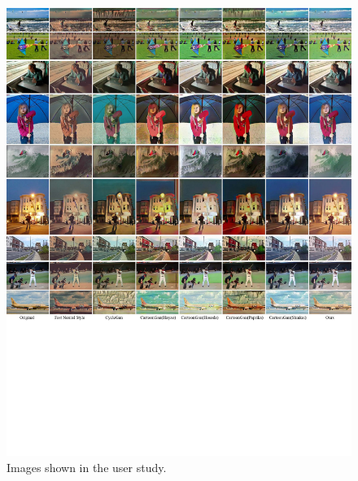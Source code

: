 \documentclass[10pt,twocolumn,letterpaper]{article}
\begin{document}
\begin{figure}[htb]
\vspace{-0.5em}
\centering
\includegraphics[width=\linewidth]{figures/userstudy3.pdf}
\caption{Images shown in the user study.}
\label{fig:userstudy3}
\end{figure}
\end{document}
